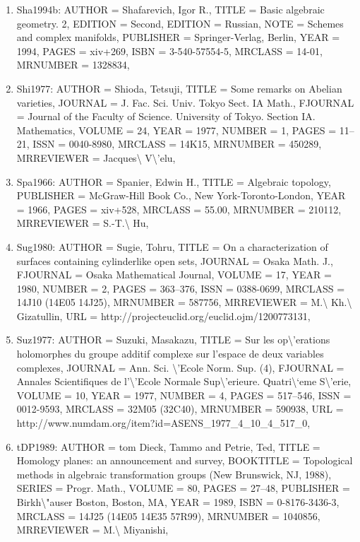 \documentclass[11pt]{article}
\begin{document}
\begin{enumerate}[leftmargin=*]
  \item Sha1994b: AUTHOR = Shafarevich, Igor R., TITLE = Basic algebraic geometry. 2, EDITION = Second, EDITION = Russian, NOTE = Schemes and complex manifolds, PUBLISHER = Springer-Verlag, Berlin, YEAR = 1994, PAGES = xiv+269, ISBN = 3-540-57554-5, MRCLASS = 14-01, MRNUMBER = 1328834,
  \item Shi1977: AUTHOR = Shioda, Tetsuji, TITLE = Some remarks on Abelian varieties, JOURNAL = J. Fac. Sci. Univ. Tokyo Sect. IA Math., FJOURNAL = Journal of the Faculty of Science. University of Tokyo. Section IA. Mathematics, VOLUME = 24, YEAR = 1977, NUMBER = 1, PAGES = 11--21, ISSN = 0040-8980, MRCLASS = 14K15, MRNUMBER = 450289, MRREVIEWER = Jacques\textbackslash{} V\textbackslash{}'elu,
  \item Spa1966: AUTHOR = Spanier, Edwin H., TITLE = Algebraic topology, PUBLISHER = McGraw-Hill Book Co., New York-Toronto-London, YEAR = 1966, PAGES = xiv+528, MRCLASS = 55.00, MRNUMBER = 210112, MRREVIEWER = S.-T.\textbackslash{} Hu,
  \item Sug1980: AUTHOR = Sugie, Tohru, TITLE = On a characterization of surfaces containing cylinderlike open sets, JOURNAL = Osaka Math. J., FJOURNAL = Osaka Mathematical Journal, VOLUME = 17, YEAR = 1980, NUMBER = 2, PAGES = 363--376, ISSN = 0388-0699, MRCLASS = 14J10 (14E05 14J25), MRNUMBER = 587756, MRREVIEWER = M.\textbackslash{} Kh.\textbackslash{} Gizatullin, URL = http://projecteuclid.org/euclid.ojm/1200773131,
  \item Suz1977: AUTHOR = Suzuki, Masakazu, TITLE = Sur les op\textbackslash{}'erations holomorphes du groupe additif complexe sur l'espace de deux variables complexes, JOURNAL = Ann. Sci. \textbackslash{}'Ecole Norm. Sup. (4), FJOURNAL = Annales Scientifiques de l'\textbackslash{}'Ecole Normale Sup\textbackslash{}'erieure. Quatri\textbackslash{}`eme S\textbackslash{}'erie, VOLUME = 10, YEAR = 1977, NUMBER = 4, PAGES = 517--546, ISSN = 0012-9593, MRCLASS = 32M05 (32C40), MRNUMBER = 590938, URL = http://www.numdam.org/item?id=ASENS\_1977\_4\_10\_4\_517\_0,
  \item tDP1989: AUTHOR = tom Dieck, Tammo and Petrie, Ted, TITLE = Homology planes: an announcement and survey, BOOKTITLE = Topological methods in algebraic transformation groups (New Brunswick, NJ, 1988), SERIES = Progr. Math., VOLUME = 80, PAGES = 27--48, PUBLISHER = Birkh\textbackslash{}"auser Boston, Boston, MA, YEAR = 1989, ISBN = 0-8176-3436-3, MRCLASS = 14J25 (14E05 14E35 57R99), MRNUMBER = 1040856, MRREVIEWER = M.\textbackslash{} Miyanishi,

\end{enumerate}
\end{document}
